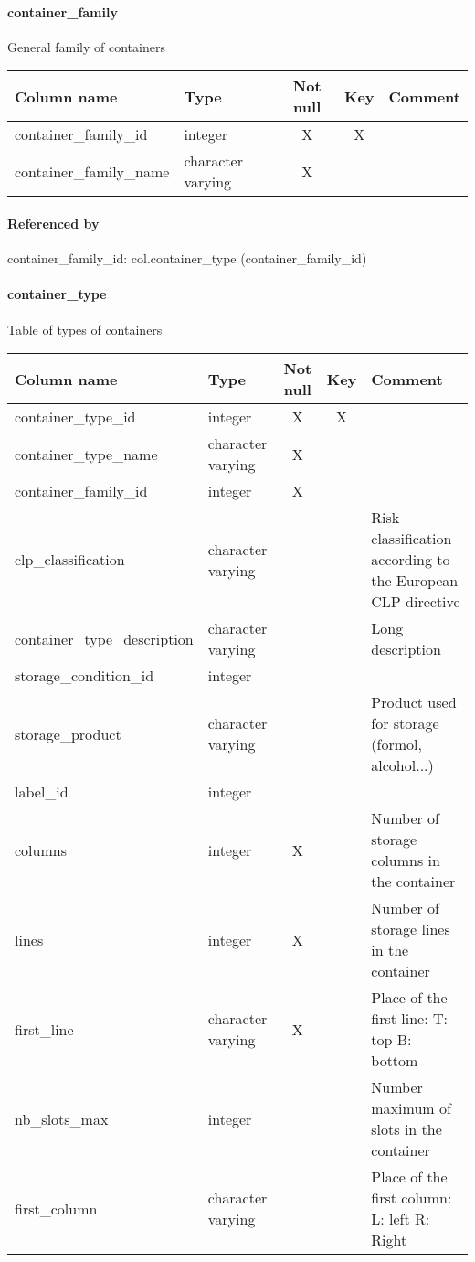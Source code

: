 \paragraph{container\_family}
General family of containers

\begin{tabular}{|l| p{2cm}|c|c| p{5cm}|}
\hline
Column name & Type & Not null & Key & Comment \\
\hline
container\_family\_id & integer & X & X & \\
container\_family\_name & character varying & X &  & \\
\hline
\end{tabular}
\paragraph{Referenced by}
container\_family\_id: col.container\_type (container\_family\_id)

\paragraph{container\_type}
Table of types of containers

\begin{tabular}{|l| p{2cm}|c|c| p{5cm}|}
\hline
Column name & Type & Not null & Key & Comment \\
\hline
container\_type\_id & integer & X & X & \\
container\_type\_name & character varying & X &  & \\
container\_family\_id & integer & X &  & \\
clp\_classification & character varying &  &  & Risk classification according to the European CLP directive\\
container\_type\_description & character varying &  &  & Long description\\
storage\_condition\_id & integer &  &  & \\
storage\_product & character varying &  &  & Product used for storage (formol, alcohol...)\\
label\_id & integer &  &  & \\
columns & integer & X &  & Number of storage columns in the container\\
lines & integer & X &  & Number of storage lines in the container\\
first\_line & character varying & X &  & Place of the first line:
T: top
B: bottom\\
nb\_slots\_max & integer &  &  & Number maximum of slots in the container\\
first\_column & character varying &  &  & Place of the first column: 
L: left
R: Right\\
\hline
\end{tabular}
